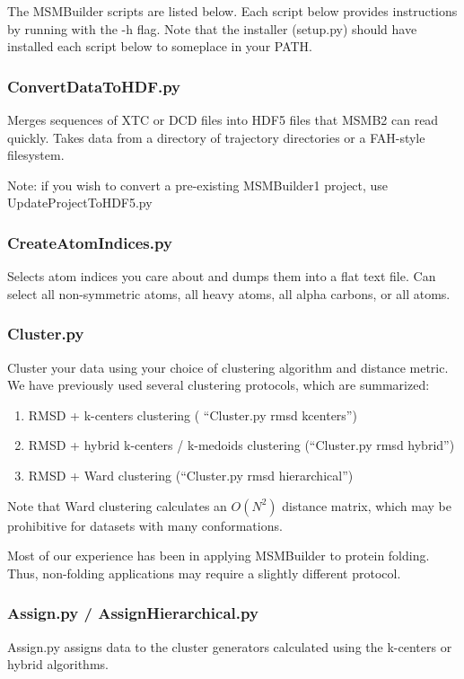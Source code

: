 \documentclass[12pt]{article}
\begin{document}
The MSMBuilder scripts are listed below.  Each script below provides instructions by running with the -h flag.  Note that the installer (setup.py) should have installed each script below to someplace in your PATH.  

\subsubsection{ConvertDataToHDF.py}

Merges sequences of XTC or DCD files into HDF5 files that MSMB2 can read quickly.  Takes data from a directory of trajectory directories or a FAH-style filesystem.  

Note: if you wish to convert a pre-existing MSMBuilder1 project, use UpdateProjectToHDF5.py 

\subsubsection{CreateAtomIndices.py}
Selects atom indices you care about and dumps them into a flat text file. Can select all non-symmetric atoms, all heavy atoms, all alpha carbons, or all atoms.

\subsubsection{Cluster.py}

Cluster your data using your choice of clustering algorithm and distance metric.  We have previously used several clustering protocols, which are summarized:

\begin{enumerate}
 \item RMSD + k-centers clustering \cite{Bowman2009c, Bowman2009a} ( ``Cluster.py  rmsd kcenters'')
 \item RMSD + hybrid k-centers / k-medoids clustering \cite{msmb2} (``Cluster.py  rmsd hybrid'')
 \item RMSD + Ward clustering \cite{beauchamp2012simple} (``Cluster.py  rmsd hierarchical'')
\end{enumerate}

Note that Ward clustering calculates an $O(N^2)$ distance matrix, which may be prohibitive for datasets with many conformations.  

Most of our experience has been in applying MSMBuilder to protein folding.  Thus, non-folding applications may require a slightly different protocol.

\subsubsection{Assign.py / AssignHierarchical.py}
Assign.py assigns data to the cluster generators calculated using the k-centers or hybrid algorithms.
\end{document}

